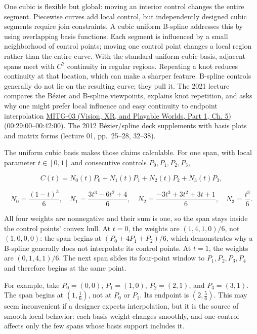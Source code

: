 One cubic is flexible but global: moving an interior control changes the entire segment. Piecewise curves add local control, but independently designed cubic segments require join constraints. A cubic uniform B-spline addresses this by using overlapping basis functions. Each segment is influenced by a small neighborhood of control points; moving one control point changes a local region rather than the entire curve. With the standard uniform cubic basis, adjacent spans meet with \(C^2\) continuity in regular regions. Repeating a knot reduces continuity at that location, which can make a sharper feature. B-spline controls generally do not lie on the resulting curve; they pull it. The 2021 lecture compares the Bézier and B-spline viewpoints, explains knot repetition, and asks why one might prefer local influence and easy continuity to endpoint interpolation \href{../07-Vision-XR-and-Playable-Worlds-P01/main.pdf\#nameddest=04-visual-computing-ii-ch036-mitg-03---curves-and-surfaces}{MITG-03 (Vision, XR, and Playable Worlds, Part 1, Ch. 5)} (00:29:00--00:42:00). The 2012 Bézier/spline deck supplements with basis plots and matrix forms (lecture 01, pp.~25--28, 32--38).

The uniform cubic basis makes those claims calculable. For one span, with local parameter \(t\in[0,1]\) and consecutive controls \(P_0,P_1,P_2,P_3\),

\[
C(t)=N_0(t)P_0+N_1(t)P_1+N_2(t)P_2+N_3(t)P_3,
\]

\[
N_0=\frac{(1-t)^3}{6},\quad N_1=\frac{3t^3-6t^2+4}{6},\quad
N_2=\frac{-3t^3+3t^2+3t+1}{6},\quad N_3=\frac{t^3}{6}.
\]

All four weights are nonnegative and their sum is one, so the span stays inside the control points' convex hull. At \(t=0\), the weights are \((1,4,1,0)/6\), not \((1,0,0,0)\): the span begins at \((P_0+4P_1+P_2)/6\), which demonstrates why a B-spline generally does not interpolate its control points. At \(t=1\), the weights are \((0,1,4,1)/6\). The next span slides its four-point window to \(P_1,P_2,P_3,P_4\) and therefore begins at the same point.

For example, take \(P_0=(0,0)\), \(P_1=(1,0)\), \(P_2=(2,1)\), and \(P_3=(3,1)\). The span begins at \((1,\frac16)\), not at \(P_0\) or \(P_1\). Its endpoint is \((2,\frac56)\). This may seem inconvenient if a designer expects interpolation, but it is the source of smooth local behavior: each basis weight changes smoothly, and one control affects only the few spans whose basis support includes it.

